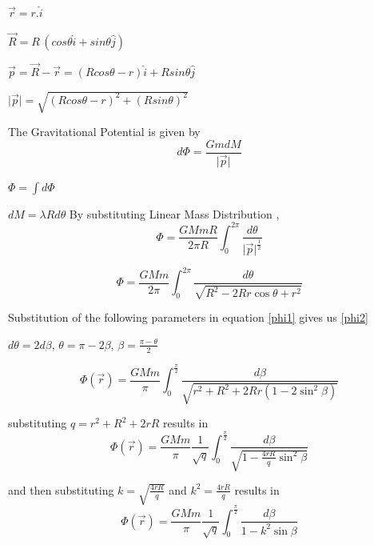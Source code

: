 \begin{center}
$ \vec{r} = r.\hat{i} $

$ \vec{R} = R\,(cos \theta \hat{i} + sin \theta \hat{j} ) $

$ \vec{p} = \vec{R}-\vec{r} = (R cos \theta-r) \hat{i} + R sin \theta \hat{j} $


$ \vert \vec{p}\vert = \sqrt{(R cos \theta - r)^{2} + (R sin \theta )^{2} }$

\vspace{0.5\baselineskip}
The Gravitational Potential is given by
\begin{equation}
 d{\Phi}= \frac{GmdM}{\vert \vec{p}\vert} 
\end{equation}


$ \Phi = \int {d{\Phi}} $
  

$ d M = \lambda R d \theta  $
\vspace{0.5\baselineskip}
By substituting Linear Mass Distribution ,
\begin{equation}
\Phi= \frac{GMmR}{2\pi R} \int_{0}^{2\pi} \frac {d \theta } {\vert \vec{p} \vert^\frac{1}{2}}
\end{equation}

\begin{equation}
\label{phi1}
\Phi= \frac{GMm}{2\pi} \int_{0}^{2\pi}  
\frac{d{\theta}}{\sqrt{R^2 - 2 R r \cos \theta + r^2}}
\end{equation}


Substitution of the following parameters in equation \eqref{phi1} gives us \eqref{phi2}

$ d \theta = 2 d \beta $,
$ \theta = \pi - 2 \beta $,
$ \beta = \frac{\pi - \theta}{2} $

\begin{equation}
\label{phi2}
\Phi (\vec{r}) = \frac{GMm}{ \pi} \int_{0}^{\frac{\pi}{2}}  \frac{d \beta }{\sqrt{r^2 + R^2 +2 R r (1 - 2 \sin^2 \beta )}}  
\end{equation}

substituting $ q = r^2 + R^2 + 2 r R$ results in 
\begin{equation}
\Phi (\vec{r}) = \frac{GMm}{ \pi} \frac{1}{\sqrt{q}} \int_{0}^{\frac{ \pi}{2}} \frac{d \beta }{\sqrt{1 - \frac{4 r R}{q} \sin^2 \beta}}   
\end{equation}
 
and then substituting $ k = \sqrt{\frac{4 r R }{q}} $ and $ k^2 = \frac{4 r R}{q} $ results in
\begin{equation}
\label{elliptic}
\Phi (\vec{r}) = \frac{GMm}{ \pi} \frac{1}{\sqrt{q}} \int_{0}^{\frac{ \pi}{2}} \frac{d \beta } {1 - k^2 \sin \beta } 
\end{equation}


\end{center}
